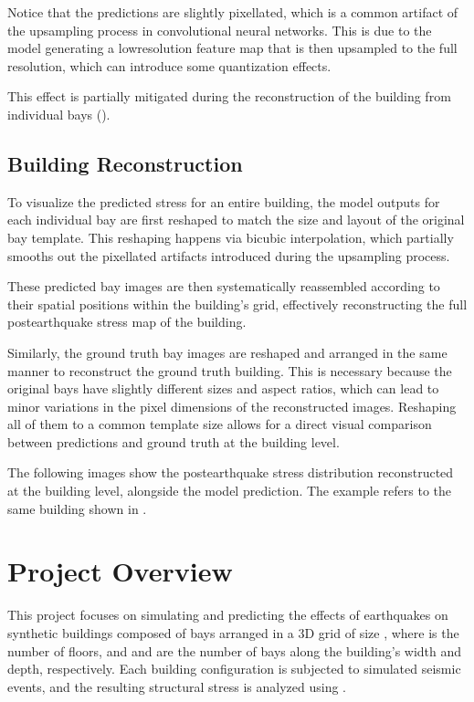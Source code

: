 \documentclass[letterpaper,10pt,english]{sphinxmanual}
\begin{document}
\sphinxAtStartPar
Notice that the predictions are slightly pixellated, which is a common
artifact of the upsampling process in convolutional neural networks.
This is due to the model generating a low\sphinxhyphen{}resolution feature map that is
then upsampled to the full resolution, which can introduce some quantization
effects.

\sphinxAtStartPar
This effect is partially mitigated during the reconstruction of the building
from individual bays ({\hyperref[\detokenize{predictions:reconstruction}]{}}).


\section{Building Reconstruction}
\label{\detokenize{predictions:building-reconstruction}}\label{\detokenize{predictions:reconstruction}}
\sphinxAtStartPar
To visualize the predicted stress for an entire building, the model outputs
for each individual bay are first reshaped to match the size and layout of
the original bay template.
This reshaping happens via bicubic interpolation, which partially smooths out
the pixellated artifacts introduced during the upsampling process.

\sphinxAtStartPar
These predicted bay images are then systematically reassembled according to
their spatial positions within the building’s grid, effectively reconstructing
the full post\sphinxhyphen{}earthquake stress map of the building.

\sphinxAtStartPar
Similarly, the ground truth bay images are reshaped and arranged in the same
manner to reconstruct the ground truth building.
This is necessary because the original bays have slightly different sizes and
aspect ratios, which can lead to minor variations in the pixel dimensions of
the reconstructed images.
Reshaping all of them to a common template size allows for a direct visual
comparison between predictions and ground truth at the building level.

\sphinxAtStartPar
\textendash{}

\sphinxAtStartPar
The following images show the post\sphinxhyphen{}earthquake stress distribution reconstructed
at the building level, alongside the model prediction.
The example refers to the same building shown in .




\chapter{Project Overview}
\label{\detokenize{index:project-overview}}
\sphinxAtStartPar
This project focuses on simulating and predicting the effects of earthquakes
on synthetic buildings composed of bays arranged in a 3D grid of size
, where  is the number of floors, and  and  are the
number of bays along the building’s width and depth, respectively.
Each building configuration is subjected to simulated seismic events, and the
resulting structural stress is analyzed using .
\end{document}
